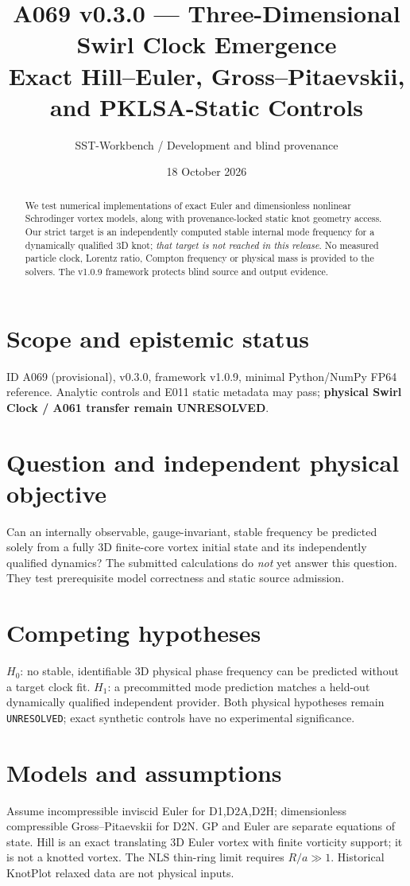 \documentclass[10pt,a4paper]{article}
\title{A069 v0.3.0 --- Three-Dimensional Swirl Clock Emergence\\Exact Hill--Euler, Gross--Pitaevskii, and PKLSA-Static Controls}
\author{SST-Workbench / Development and blind provenance}
\date{18 October 2026}
\begin{document}
\maketitle
\begin{abstract}
We test numerical implementations of exact Euler and dimensionless nonlinear Schrodinger vortex models, along with provenance-locked static knot geometry access. Our strict target is an independently computed stable internal mode frequency for a dynamically qualified 3D knot; \emph{that target is not reached in this release}. No measured particle clock, Lorentz ratio, Compton frequency or physical mass is provided to the solvers. The v1.0.9 framework protects blind source and output evidence.
\end{abstract}
\section{Scope and epistemic status}
ID A069 (provisional), v0.3.0, framework v1.0.9, minimal Python/NumPy FP64 reference. Analytic controls and E011 static metadata may pass; \textbf{physical Swirl Clock / A061 transfer remain UNRESOLVED}.
\section{Question and independent physical objective}
Can an internally observable, gauge-invariant, stable frequency be predicted solely from a fully 3D finite-core vortex initial state and its independently qualified dynamics? The submitted calculations do \emph{not} yet answer this question. They test prerequisite model correctness and static source admission.
\section{Competing hypotheses}
$H_0$: no stable, identifiable 3D physical phase frequency can be predicted without a target clock fit. $H_1$: a precommitted mode prediction matches a held-out dynamically qualified independent provider. Both physical hypotheses remain \texttt{UNRESOLVED}; exact synthetic controls have no experimental significance.
\section{Models and assumptions}
Assume incompressible inviscid Euler for D1,D2A,D2H; dimensionless compressible Gross--Pitaevskii for D2N. GP and Euler are separate equations of state. Hill is an exact translating 3D Euler vortex with finite vorticity support; it is not a knotted vortex. The NLS thin-ring limit requires $R/a\gg1$. Historical KnotPlot relaxed data are not physical inputs.
\end{document}
